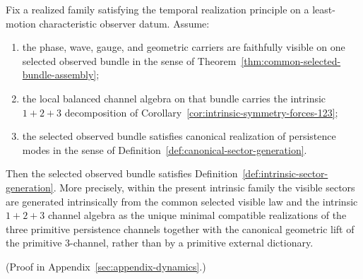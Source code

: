 \begin{theorem}
\label{thm:scoped-intrinsic-sector-generation}
Fix a realized family satisfying the temporal realization principle on a
least-motion characteristic observer datum. Assume:
\begin{enumerate}[label=(\roman*), leftmargin=2em, itemsep=0.2em]
\item the phase, wave, gauge, and geometric carriers are faithfully visible on
      one selected observed bundle in the sense of
      Theorem~\ref{thm:common-selected-bundle-assembly};
\item the local balanced channel algebra on that bundle carries the intrinsic
      \(1+2+3\) decomposition of
      Corollary~\ref{cor:intrinsic-symmetry-forces-123};
\item the selected observed bundle satisfies canonical realization of
      persistence modes in the sense of
      Definition~\ref{def:canonical-sector-generation}.
\end{enumerate}
Then the selected observed bundle satisfies
Definition~\ref{def:intrinsic-sector-generation}. More precisely, within the
present intrinsic family the visible sectors are generated intrinsically from
the common selected visible law and the intrinsic \(1+2+3\) channel algebra as
the unique minimal compatible realizations of the three primitive persistence
channels together with the canonical geometric lift of the primitive
\(3\)-channel, rather than by a primitive external dictionary.
\end{theorem}

(Proof in Appendix~\ref{sec:appendix-dynamics}.)

